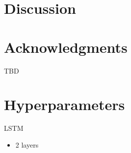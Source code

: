 \documentclass[11pt,a4paper]{article}
\begin{document}
\paragraph{}

\section{Discussion}


\section*{Acknowledgments}
TBD




\appendix

\section{Hyperparameters}
\label{sec:hyperparams}
LSTM
\begin{itemize}
\item 2 layers
\end{itemize}
\end{document}
